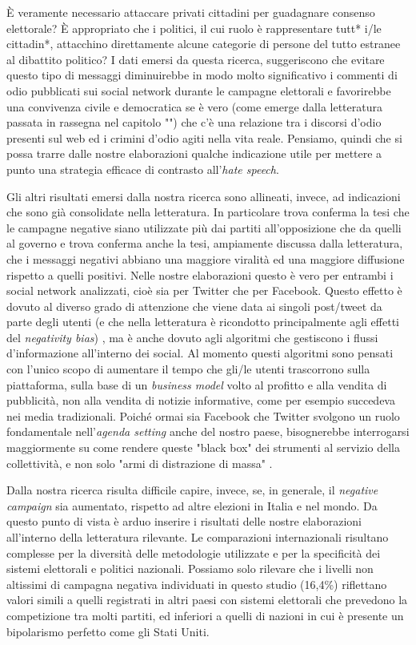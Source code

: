 È veramente necessario attaccare privati cittadini per guadagnare consenso elettorale? È appropriato che i politici, il cui ruolo è rappresentare tutt* i/le cittadin*, attacchino direttamente alcune categorie di persone del tutto estranee al dibattito politico?
I dati emersi da  questa ricerca, suggeriscono che evitare questo tipo di messaggi diminuirebbe in modo molto significativo i commenti di odio pubblicati sui social network durante le campagne elettorali e favorirebbe una convivenza civile e democratica se è vero (come emerge dalla letteratura passata in rassegna nel capitolo "") che c’è una relazione tra i discorsi d’odio presenti sul web ed i crimini d’odio agiti nella vita reale. Pensiamo, quindi che si possa trarre dalle nostre elaborazioni qualche indicazione utile per mettere a punto una strategia efficace di contrasto all’\textit{hate speech}.

Gli altri risultati emersi dalla nostra ricerca sono allineati, invece, ad indicazioni che sono già consolidate nella letteratura. In particolare trova conferma la tesi che le campagne negative siano utilizzate più dai partiti all’opposizione che da quelli al governo e trova conferma anche la tesi, ampiamente discussa dalla letteratura, che i messaggi negativi abbiano una maggiore viralità ed una maggiore diffusione rispetto a quelli positivi. Nelle nostre elaborazioni questo è vero per entrambi i social network analizzati, cioè sia per Twitter che per Facebook. Questo effetto è dovuto al diverso grado di attenzione che viene data ai singoli post/tweet da parte degli utenti (e che nella letteratura è ricondotto principalmente agli effetti del \textit{negativity bias}) , ma è anche dovuto agli algoritmi che gestiscono i flussi d'informazione all'interno dei social. Al momento questi algoritmi sono pensati con l'unico scopo di aumentare il tempo che gli/le utenti trascorrono sulla piattaforma, sulla base di un \textit{business model} volto al profitto e alla vendita di pubblicità, non alla vendita di notizie informative, come per esempio succedeva nei media tradizionali. Poiché ormai sia Facebook che Twitter svolgono un ruolo fondamentale nell'\textit{agenda setting} anche del nostro paese, bisognerebbe interrogarsi maggiormente su come rendere queste "black box" dei strumenti al servizio della collettività, e non solo "armi di distrazione di massa" \citep{rosen2012}.

Dalla nostra ricerca risulta difficile capire, invece, se, in generale, il \textit{negative campaign} sia aumentato, rispetto ad altre elezioni in Italia e nel mondo. Da questo punto di vista è arduo inserire i risultati delle nostre elaborazioni all’interno della letteratura rilevante. Le comparazioni internazionali risultano complesse per la diversità delle metodologie utilizzate e per la specificità dei sistemi elettorali e politici nazionali. Possiamo solo rilevare che i livelli non altissimi di campagna negativa individuati in questo studio (16,4\%) riflettano valori simili a quelli registrati in altri paesi con sistemi elettorali che prevedono la competizione tra molti partiti, ed inferiori a quelli  di nazioni in cui è presente un bipolarismo perfetto come gli Stati Uniti.

